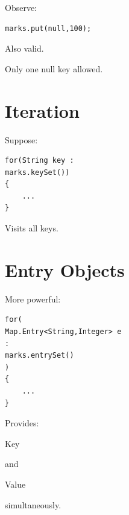 \documentclass[11pt,a4paper]{book}
\begin{document}
Observe:

\begin{verbatim} 
marks.put(null,100);
\end{verbatim}


Also valid.


Only one null key allowed.


\section{Iteration}

Suppose:

\begin{verbatim} 
for(String key :
marks.keySet())
{
    ...
}
\end{verbatim}


Visits all keys.


\section{Entry Objects}

More powerful:

\begin{verbatim} 
for(
Map.Entry<String,Integer> e
:
marks.entrySet()
)
{
    ...
}
\end{verbatim}


Provides:


Key


and


Value


simultaneously.
\end{document}
